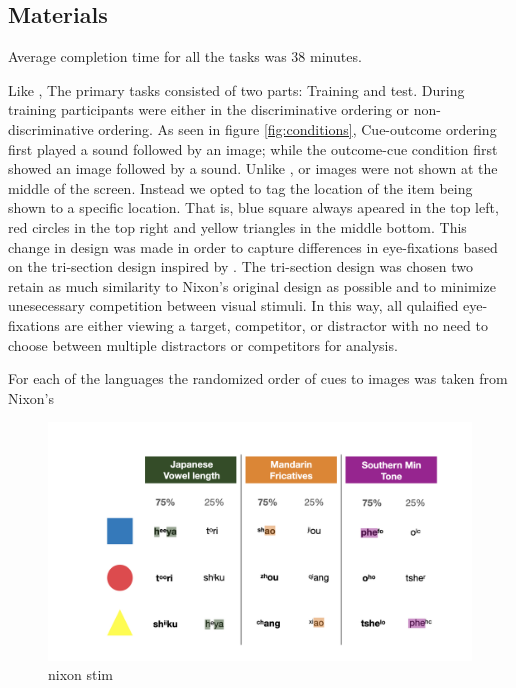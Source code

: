 \subsection{Materials}

Average completion time for all the tasks was 38 minutes.

Like \cite{nixon2020mice}, The primary tasks consisted of two parts: Training and test. During training participants were either in the discriminative ordering or non-discriminative ordering. As seen in figure \ref{fig:conditions}, Cue-outcome ordering first played a sound followed by an image; while the outcome-cue condition first showed an image followed by a sound. Unlike \cite{nixon2020mice}, or images were not shown at the middle of the screen. Instead we opted to tag the location of the item being shown to a specific location. That is, blue square always apeared in the top left, red circles in the top right and yellow triangles in the middle bottom. This change in design was made in order to capture differences in eye-fixations based on the tri-section design inspired by \cite{gruter2020classifiers}. The tri-section design was chosen two retain as much similarity to Nixon's original design as possible and to minimize unesecessary competition between visual stimuli. In this way, all qulaified eye-fixations are either viewing a target, competitor, or distractor with no need to choose between multiple distractors or competitors for analysis. 

For each of the languages the randomized order of cues to images was taken from Nixon's 

\begin{figure}[H]
  \centering
  \includegraphics[width=1\linewidth]{visualizations/visualizations/visualizations.004.jpeg}
  \caption{nixon stim}
  \label{fig:my_stim_languages}
\end{figure}


